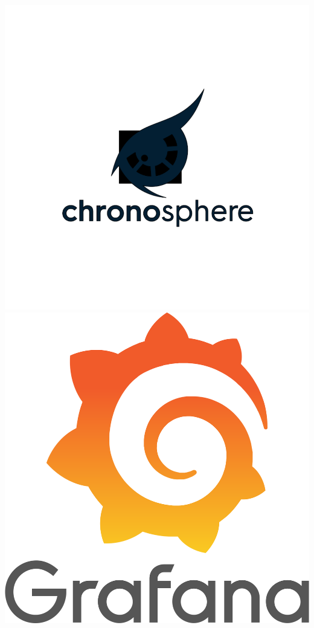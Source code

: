 \documentclass[aspectratio=169]{beamer}
\begin{document}
\begin{frame}
        \begin{columns}[t]
        \centering
                \vspace{0.5cm}
                \includegraphics[scale=0.1]{images/Chronosphere.png}\\
                \vspace{0.1cm}
                \includegraphics[scale=0.05]{images/Grafana.png}\\

\end{columns}
\end{frame}
\end{document}
